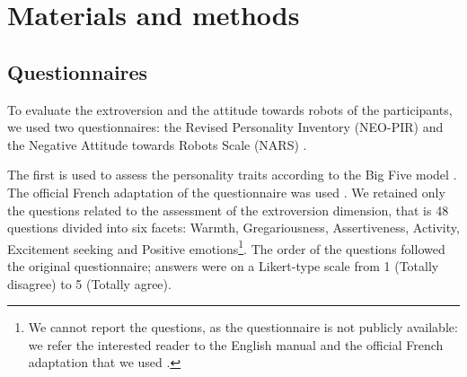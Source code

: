 \documentclass[twocolumn]{svjour3}          %
\renewcommand{\sl}[1]{\color{green} { #1 } \normalcolor}
\begin{document}
\section{Materials and methods}\label{sec:material}


\subsection{Questionnaires}

To evaluate the extroversion and the attitude towards robots of the participants, we used two questionnaires: the Revised Personality Inventory (NEO-PIR) \cite{NEOPIR1992} and the Negative Attitude towards Robots Scale (NARS) \cite{NARS2006}.

The first is used to assess the personality traits according to the Big Five model \cite{BIGFIVE}. The official French adaptation of the questionnaire was used \cite{NEOPIR1998}. We retained only the questions related to the assessment of the extroversion dimension, that is 48 questions divided into six facets: Warmth, Gregariousness, Assertiveness, Activity, Excitement seeking and Positive emotions\footnote{We cannot report the questions, as the questionnaire is not publicly available: we refer the interested reader to the English manual \cite{NEOPIR1992} and the official French adaptation that we used \cite{NEOPIR1998}.}.
The order of the questions followed the original questionnaire; answers were on a Likert-type scale from 1 (Totally disagree) to 5 (Totally agree). 
\end{document}
